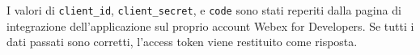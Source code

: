 \begin{enumerate}
    I valori di \texttt{client\_id}, \texttt{client\_secret}, e \texttt{code} sono stati reperiti dalla pagina di integrazione 
    dell'applicazione sul proprio account Webex for Developers.
    Se tutti i dati passati sono corretti, l'access token viene restituito come risposta.
 
\end{enumerate}
\label{sec:recupero_access_token}